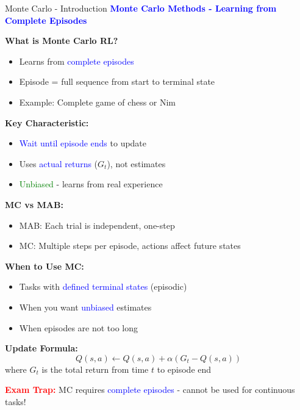 \documentclass[8pt]{beamer}
\begin{document}
	
	\begin{frame}{Monte Carlo - Introduction}
		\fontsize{6.5}{7.5}\selectfont
		\textcolor{blue}{\textbf{Monte Carlo Methods - Learning from Complete Episodes}}
		
		\textbf{What is Monte Carlo RL?}
		\begin{itemize}
			\item Learns from \textcolor{blue}{complete episodes}
			\item Episode = full sequence from start to terminal state
			\item Example: Complete game of chess or Nim
		\end{itemize}
		
		\textbf{Key Characteristic:}
		\begin{itemize}
			\item \textcolor{blue}{Wait until episode ends} to update
			\item Uses \textcolor{blue}{actual returns} ($G_t$), not estimates
			\item \textcolor{green}{Unbiased} - learns from real experience
		\end{itemize}
		
		\textbf{MC vs MAB:}
		\begin{itemize}
			\item MAB: Each trial is independent, one-step
			\item MC: Multiple steps per episode, actions affect future states
		\end{itemize}
		
		\textbf{When to Use MC:}
		\begin{itemize}
			\item Tasks with \textcolor{blue}{defined terminal states} (episodic)
			\item When you want \textcolor{blue}{unbiased} estimates
			\item When episodes are not too long
		\end{itemize}
		
		\textbf{Update Formula:}
		\[
		Q(s,a) \leftarrow Q(s,a) + \alpha(G_t - Q(s,a))
		\]
		where $G_t$ is the total return from time $t$ to episode end
		
		\textcolor{red}{\textbf{Exam Trap:}} MC requires \textcolor{blue}{complete episodes} - cannot be used for continuous tasks!
	\end{frame}
	
\end{document}
